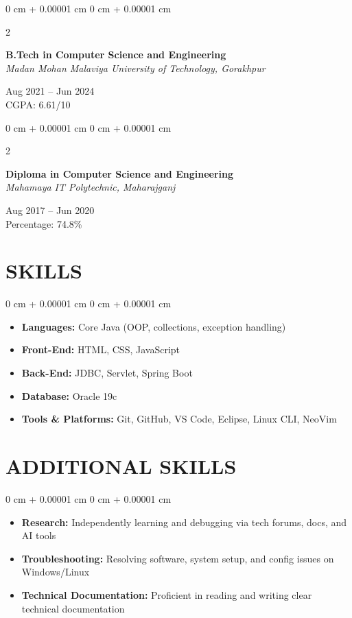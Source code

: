 \documentclass[10pt, letterpaper]{article}
\newenvironment{onecolentry}{
    \begin{adjustwidth}{
        0 cm + 0.00001 cm
    }{
        0 cm + 0.00001 cm
    }
}{
    \end{adjustwidth}
} %
\newenvironment{twocolentry}[2][]{
    \onecolentry
    \def\secondColumn{#2}
    \setcolumnwidth{\fill, 4.5 cm}
    \begin{paracol}{2}
}{
    \switchcolumn \raggedleft \secondColumn
    \end{paracol}
    \endonecolentry
} %
\begin{document}
\begin{twocolentry}{
    Aug 2021 – Jun 2024 \\
    CGPA: 6.61/10  %
}
    \textbf{B.Tech in Computer Science and Engineering} \\
    \textit{Madan Mohan Malaviya University of Technology, Gorakhpur}
\end{twocolentry}

\vspace{0.2cm}

\begin{twocolentry}{
    Aug 2017 – Jun 2020 \\
    Percentage: 74.8\%  %
}
    \textbf{Diploma in Computer Science and Engineering} \\
    \textit{Mahamaya IT Polytechnic, Maharajganj}
\end{twocolentry}
    
    \section{SKILLS}
        \vspace{0.2 cm}

        \begin{onecolentry}
            \begin{itemize}[leftmargin=*,noitemsep,topsep=0pt]
                \item \textbf{Languages:} Core Java (OOP, collections, exception handling)
                \item \textbf{Front-End:} HTML, CSS, JavaScript
                \item \textbf{Back-End:} JDBC, Servlet, Spring Boot
                \item \textbf{Database:} Oracle 19c
                \item \textbf{Tools \& Platforms:} Git, GitHub, VS Code, Eclipse, Linux CLI, NeoVim
            \end{itemize}
        \end{onecolentry}
    
    \section{ADDITIONAL SKILLS}
        \vspace{0.2 cm}
        
        \begin{onecolentry}
            \begin{itemize}[leftmargin=*,noitemsep,topsep=0pt]
                \item \textbf{Research:} Independently learning and debugging via tech forums, docs, and AI tools
                \item \textbf{Troubleshooting:} Resolving software, system setup, and config issues on Windows/Linux
                \item \textbf{Technical Documentation:} Proficient in reading and writing clear technical documentation
            \end{itemize}
        \end{onecolentry}
    
\end{document}
